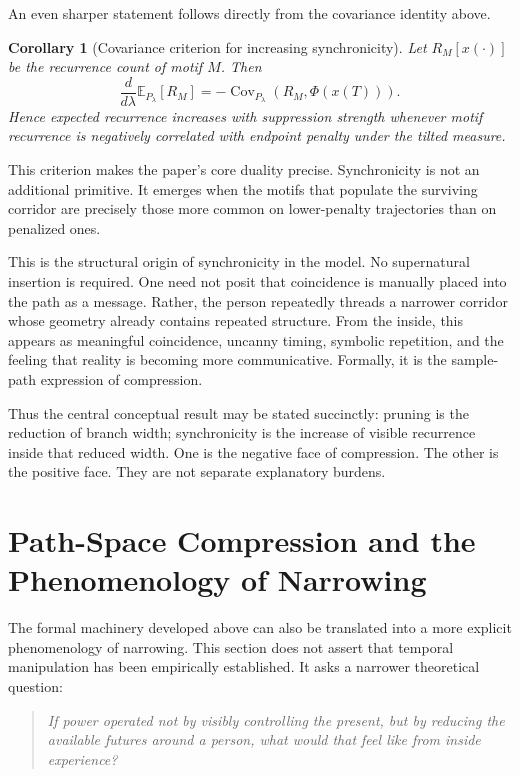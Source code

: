 \documentclass[12pt]{article}
\newtheorem{corollary}{Corollary}
\begin{document}
An even sharper statement follows directly from the covariance identity above.

\begin{corollary}[Covariance criterion for increasing synchronicity]
Let $R_M[x(\cdot)]$ be the recurrence count of motif $M$. Then
\[
\frac{d}{d\lambda}\mathbb{E}_{P_\lambda}[R_M]
= -\operatorname{Cov}_{P_\lambda}(R_M,\Phi(x(T))).
\]
Hence expected recurrence increases with suppression strength whenever motif recurrence is negatively correlated with endpoint penalty under the tilted measure.
\end{corollary}

This criterion makes the paper's core duality precise. Synchronicity is not an additional primitive. It emerges when the motifs that populate the surviving corridor are precisely those more common on lower-penalty trajectories than on penalized ones.

This is the structural origin of synchronicity in the model. No supernatural insertion is required. One need not posit that coincidence is manually placed into the path as a message. Rather, the person repeatedly threads a narrower corridor whose geometry already contains repeated structure. From the inside, this appears as meaningful coincidence, uncanny timing, symbolic repetition, and the feeling that reality is becoming more communicative. Formally, it is the sample-path expression of compression.

Thus the central conceptual result may be stated succinctly: pruning is the reduction of branch width; synchronicity is the increase of visible recurrence inside that reduced width. One is the negative face of compression. The other is the positive face. They are not separate explanatory burdens.

\section{Path-Space Compression and the Phenomenology of Narrowing}

The formal machinery developed above can also be translated into a more explicit phenomenology of narrowing. This section does not assert that temporal manipulation has been empirically established. It asks a narrower theoretical question:

\begin{quote}
\textit{If power operated not by visibly controlling the present, but by reducing the available futures around a person, what would that feel like from inside experience?}
\end{quote}
\end{document}

